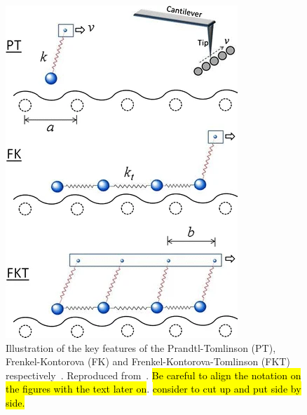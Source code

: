 \begin{figure}[H]
  \centering
  \includegraphics[width=0.4\linewidth]{figures/theory/PT_FK_FKT.png}
  \caption{Illustration of the key features of the Prandtl-Tomlinson (\acrshort{PT}), Frenkel-Kontorova (\acrshort{FK}) and Frenkel-Kontorova-Tomlinson (\acrshort{FKT}) respectively~\cite{Yalin_2011}. Reproduced from~\cite{Yalin_2011}. \hl{Be careful to align the notation on the figures with the text later on}. \hl{consider to cut up and put side by side.}}
  \label{fig:PT_FK_FKT}
\end{figure}


